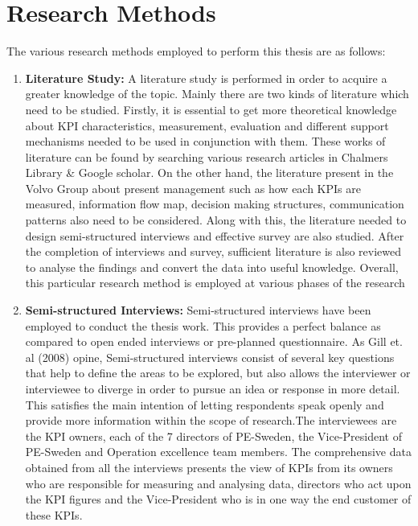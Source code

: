 \section{Research Methods}
The various research methods employed to perform this thesis are as follows:\\
\begin{enumerate}
    \item \textbf{Literature Study:}
A literature study is performed in order to acquire a greater knowledge of the topic. Mainly there are two kinds of literature which need to be studied. Firstly, it is essential to get more theoretical knowledge about KPI characteristics, measurement, evaluation and different support mechanisms needed to be used in conjunction with them. These works of literature can be found by searching various research articles in Chalmers Library & Google scholar. On the other hand, the literature present in the Volvo Group about present management such as how each KPIs are measured, information flow map, decision making structures, communication patterns also need to be considered. Along with this, the literature needed to design semi-structured interviews and effective survey are also studied. After the completion of interviews and survey, sufficient literature is also reviewed to analyse the findings and convert the data into useful knowledge. Overall, this particular research method is employed at various phases of the research\\
  
    \item \textbf{Semi-structured Interviews:}
    Semi-structured interviews have been employed to conduct the thesis work. This provides a perfect balance as compared to open ended interviews or pre-planned questionnaire. As Gill et. al (2008) opine, Semi-structured interviews consist of several key questions that help to define the areas to be explored, but also allows the interviewer or interviewee to diverge in order to pursue an idea or response in more detail. This satisfies the main intention of letting respondents speak openly and provide more information within the scope of research.The interviewees are the KPI owners, each of the 7 directors of PE-Sweden, the Vice-President of PE-Sweden and Operation excellence team members. The comprehensive data obtained from all the interviews presents the view of KPIs from its owners who are responsible for measuring and analysing data, directors who act upon the KPI figures and the Vice-President who is in one way the end customer of these KPIs.\\
  

\end{enumerate}
